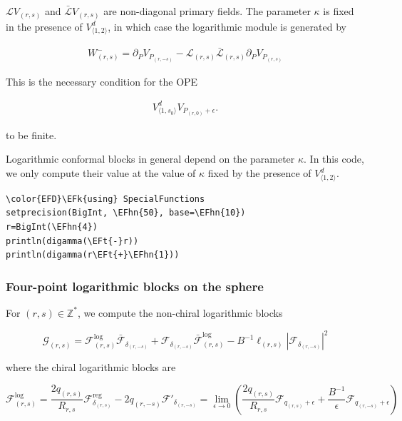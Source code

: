 \documentclass[a4paper]{article}
\numberwithin{equation}{section}
\newcommand{\EFk}[1]{\textcolor{EFk}{#1}} %
\newcommand{\EFt}[1]{\textcolor{EFt}{#1}} %
\newcommand{\EFhn}[1]{\textcolor{EFhn}{#1}} %
\begin{document}
\(\mathcal L V_{(r,s)}\) and \(\bar{\mathcal L} V_{(r,s)}\) are non-diagonal primary fields. The parameter \(\kappa\) is fixed in the presence of \(V^d_{\langle1,2\rangle}\), in which case the logarithmic module is generated by

\begin{align}
  W^{-}_{(r,s)} = \partial_{P} V_{P_{(r,-s)}} - \mathcal{L}_{(r,s)} \bar{\mathcal{L}}_{(r,s)} \partial_{P} V_{P_{(r,s)}}
\end{align}

This is the necessary condition for the OPE

\begin{align}
  V^{d}_{\langle 1,s_{0}\rangle} V_{P_{(r,0)}+\epsilon}.
\end{align}

to be finite.

Logarithmic conformal blocks in general depend on the parameter \(\kappa\). In this code, we only compute their value at the value of \(\kappa\) fixed by the presence of \(V^d_{\langle1,2\rangle}\).

\begin{Code}
\begin{Verbatim}
\color{EFD}\EFk{using} SpecialFunctions
setprecision(BigInt, \EFhn{50}, base=\EFhn{10})
r=BigInt(\EFhn{4})
println(digamma(\EFt{-}r))
println(digamma(r\EFt{+}\EFhn{1}))
\end{Verbatim}
\end{Code}
\subsubsection*{Four-point logarithmic blocks on the sphere}
\label{sec:orgcf597f3}

For \((r,s)\in \mathbb{Z}^*\), we compute the non-chiral logarithmic blocks

$$
\mathcal{G}_{(r,s)} = \mathcal{F}^\text{log}_{(r,s)} \bar{\mathcal{F}}_{\delta_{(r,-s)}} +\mathcal{F}_{\delta_{( r,-s)}} \bar{\mathcal{F}}^\text{log}_{(r,s)} - B^{-1}\ell_{(r,s)}\left| \mathcal{F}_{\delta_{(r,-s)}}\right|^2
$$

where the chiral logarithmic blocks are

$$\label{eq:log_block_chiral}
\mathcal{F}_{( r,s)}^\text{log}
= \frac{2q_{( r,s)}}{R_{r,s}} \mathcal{F}_{\delta_{(r,s)}}^\text{reg} -2q_{(r,-s)}\mathcal{F}'_{\delta_{(r,-s)}}
= \lim_{\epsilon\to 0} \left(\frac{2q_{( r,s)}}{R_{r,s}} \mathcal{F}_{q_{(r,s)}+\epsilon} +\frac{B^{-1}}{\epsilon} \mathcal{F}_{q_{(r,-s)}+\epsilon}\right)
$$
\end{document}
